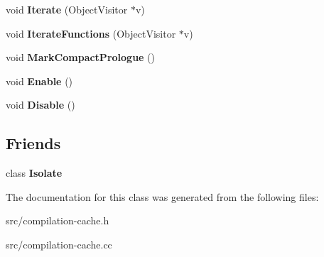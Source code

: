 \begin{DoxyCompactItemize}
\item 
\hypertarget{classv8_1_1internal_1_1_compilation_cache_a07786e494a1dab1a751c2f2ef0219142}{}void {\bfseries Iterate} (Object\+Visitor $\ast$v)\label{classv8_1_1internal_1_1_compilation_cache_a07786e494a1dab1a751c2f2ef0219142}

\item 
\hypertarget{classv8_1_1internal_1_1_compilation_cache_a2f5fac4c5b1e4e7af8a92144f0e6ca50}{}void {\bfseries Iterate\+Functions} (Object\+Visitor $\ast$v)\label{classv8_1_1internal_1_1_compilation_cache_a2f5fac4c5b1e4e7af8a92144f0e6ca50}

\item 
\hypertarget{classv8_1_1internal_1_1_compilation_cache_a6c6f1bec5e0eeb46801ff0f051fd381a}{}void {\bfseries Mark\+Compact\+Prologue} ()\label{classv8_1_1internal_1_1_compilation_cache_a6c6f1bec5e0eeb46801ff0f051fd381a}

\item 
\hypertarget{classv8_1_1internal_1_1_compilation_cache_a6d0cf1b1046d4d5cc267b0c5283f3184}{}void {\bfseries Enable} ()\label{classv8_1_1internal_1_1_compilation_cache_a6d0cf1b1046d4d5cc267b0c5283f3184}

\item 
\hypertarget{classv8_1_1internal_1_1_compilation_cache_a819ae9c9a4c7d9761173b96bae5494e4}{}void {\bfseries Disable} ()\label{classv8_1_1internal_1_1_compilation_cache_a819ae9c9a4c7d9761173b96bae5494e4}

\end{DoxyCompactItemize}
\subsection*{Friends}
\begin{DoxyCompactItemize}
\item 
\hypertarget{classv8_1_1internal_1_1_compilation_cache_aba4f0964bdacf2bbf62cf876e5d28d0a}{}class {\bfseries Isolate}\label{classv8_1_1internal_1_1_compilation_cache_aba4f0964bdacf2bbf62cf876e5d28d0a}

\end{DoxyCompactItemize}


The documentation for this class was generated from the following files\+:\begin{DoxyCompactItemize}
\item 
src/compilation-\/cache.\+h\item 
src/compilation-\/cache.\+cc\end{DoxyCompactItemize}
